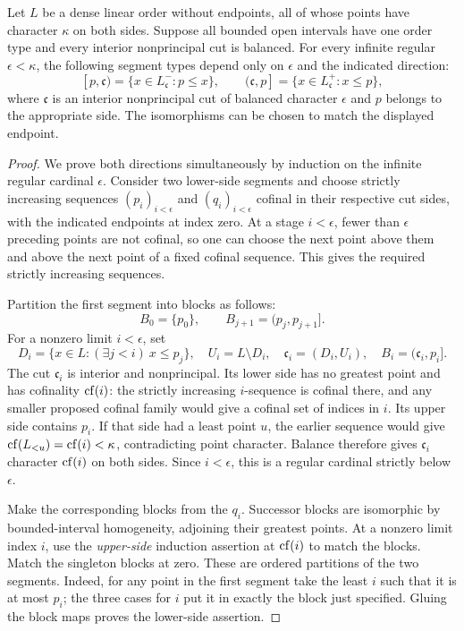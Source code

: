 \begin{lemma}
\label{found:cut-segments}
Let $L$ be a dense linear order without endpoints, all of whose
points have character $\kappa$ on both sides. Suppose all bounded
open intervals have one order type and every interior nonprincipal
cut is balanced. For every infinite regular $\epsilon<\kappa$,
the following segment types depend only on $\epsilon$ and the
indicated direction:
\[
[p,\mathfrak c)=\{x\in L^-_{\mathfrak c}:p\leq x\},
\qquad
(\mathfrak c,p]=\{x\in L^+_{\mathfrak c}:x\leq p\},
\]
where $\mathfrak c$ is an interior nonprincipal cut of balanced
character $\epsilon$ and $p$ belongs to the appropriate side.
The isomorphisms can be chosen to match the displayed endpoint.
\end{lemma}

\begin{proof}
We prove both directions simultaneously by induction on the
infinite regular cardinal $\epsilon$. Consider two lower-side
segments and choose strictly increasing sequences
$(p_i)_{i<\epsilon}$ and $(q_i)_{i<\epsilon}$ cofinal in their
respective cut sides, with the indicated endpoints at index zero.
At a stage $i<\epsilon$, fewer than $\epsilon$ preceding points
are not cofinal, so one can choose the next point above them and
above the next point of a fixed cofinal sequence. This gives the
required strictly increasing sequences.

Partition the first segment into blocks as follows:
\[
B_0=\{p_0\},\qquad B_{j+1}=(p_j,p_{j+1}].
\]
For a nonzero limit $i<\epsilon$, set
\[
D_i=\{x\in L:(\exists j<i)\ x\leq p_j\},\quad
U_i=L\setminus D_i,\quad
\mathfrak c_i=(D_i,U_i),\quad B_i=(\mathfrak c_i,p_i].
\]
The cut $\mathfrak c_i$ is interior and nonprincipal. Its lower
side has no greatest point and has cofinality $\operatorname{cf}(i)$: the
strictly increasing $i$-sequence is cofinal there, and any
smaller proposed cofinal family would give a cofinal set of
indices in $i$. Its upper side contains $p_i$. If that side had
a least point $u$, the earlier sequence would give
$\operatorname{cf}(L_{<u})=\operatorname{cf}(i)<\kappa$, contradicting point character.
Balance therefore gives $\mathfrak c_i$ character $\operatorname{cf}(i)$ on
both sides. Since $i<\epsilon$, this is a regular cardinal
strictly below $\epsilon$.

Make the corresponding blocks from the $q_i$. Successor blocks
are isomorphic by bounded-interval homogeneity, adjoining their
greatest points. At a nonzero limit index $i$, use the
\emph{upper-side} induction assertion at $\operatorname{cf}(i)$ to match the
blocks. Match the singleton blocks at zero. These are ordered
partitions of the two segments. Indeed, for any point in the
first segment take the least $i$ such that it is at most $p_i$;
the three cases for $i$ put it in exactly the block just
specified. Gluing the block maps proves the lower-side assertion.


\end{proof}
